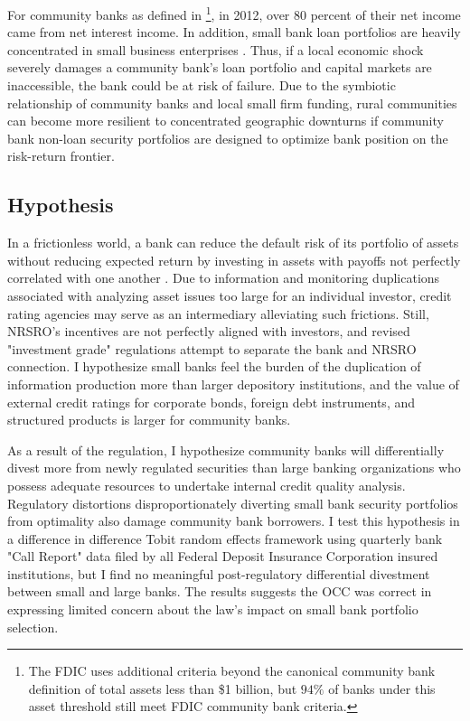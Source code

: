 \documentclass[preprint,12pt]{elsarticle}
\begin{document}
For community banks as defined in \citet{FederalDepositInsuranceCorporation2012}\footnote{The FDIC uses additional criteria beyond the canonical community bank definition of total assets less than \$1 billion, but $94\%$ of banks under this asset threshold still meet FDIC community bank criteria.}, in 2012, over 80 percent of their net income came from net interest income.  In addition, small bank loan portfolios are heavily concentrated in small business enterprises \citep{Reichow2017}.  Thus, if a local economic shock severely damages a community bank's loan portfolio and capital markets are inaccessible, the bank could be at risk of failure.  Due to the symbiotic relationship of community banks and local small firm funding, rural communities can become more resilient to concentrated geographic downturns if community bank non-loan security portfolios are designed to optimize bank position on the risk-return frontier. 

\subsection{Hypothesis}
In a frictionless world, a bank can reduce the default risk of its portfolio of assets without reducing expected return by investing in assets with payoffs not perfectly correlated with one another \citep{Diamond1984}.  Due to information and monitoring duplications associated with analyzing asset issues too large for an individual investor, credit rating agencies may serve as an intermediary alleviating such frictions.  Still, NRSRO's incentives are not perfectly aligned with investors, and revised "investment grade" regulations attempt to separate the bank and NRSRO connection.  I hypothesize small banks feel the burden of the duplication of information production more than larger depository institutions, and the value of external credit ratings for corporate bonds, foreign debt instruments, and structured products is larger for community banks.  

As a result of the regulation, I hypothesize community banks will differentially divest more from newly regulated securities than large banking organizations who possess adequate resources to undertake internal credit quality analysis.  Regulatory distortions disproportionately diverting small bank security portfolios from optimality also damage community bank borrowers.  I test this hypothesis in a difference in difference Tobit random effects framework using quarterly bank "Call Report" data filed by all Federal Deposit Insurance Corporation insured institutions, but I find no meaningful post-regulatory differential divestment between small and large banks.  The results suggests the OCC was correct in expressing limited concern about the law's impact on small bank portfolio selection. 
\end{document}
